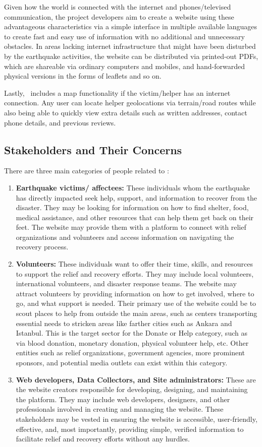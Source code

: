 Given how the world is connected with the internet and phones/televised communication, the project developers aim to create a website using these advantageous characteristics via a simple interface in multiple available languages to create fast and easy use of information with no additional and unnecessary obstacles. In areas lacking internet infrastructure that might have been disturbed by the earthquake activities, the website can be distributed via printed-out PDFs, which are shareable via ordinary computers and mobiles, and hand-forwarded physical versions in the forms of leaflets and so on.

Lastly, \afetbilgi\ includes a map functionality if the victim/helper has an internet connection. Any user can locate helper geolocations via terrain/road routes while also being able to quickly view extra details such as written addresses, contact phone details, and previous reviews.

\subsection{Stakeholders and Their Concerns}

There are three main categories of people related to \afetbilgi:
\begin{enumerate}
  \item \textbf{Earthquake victims/ affectees:} These individuals whom the earthquake has directly impacted seek help, support, and information to recover from the disaster. They may be looking for information on how to find shelter, food, medical assistance, and other resources that can help them get back on their feet. The website may provide them with a platform to connect with relief organizations and volunteers and access information on navigating the recovery process.
  \item \textbf{Volunteers:} These individuals want to offer their time, skills, and resources to support the relief and recovery efforts. They may include local volunteers, international volunteers, and disaster response teams. The website may attract volunteers by providing information on how to get involved, where to go, and what support is needed. Their primary use of the website could be to scout places to help from outside the main areas, such as centers transporting essential needs to stricken areas like farther cities such as Ankara and Istanbul. This is the target sector for the Donate or Help category, such as via blood donation, monetary donation, physical volunteer help, etc. Other entities such as relief organizations, government agencies, more prominent sponsors, and potential media outlets can exist within this category.
  \item \textbf{Web developers, Data Collectors, and Site administrators:} These are the website creators responsible for developing, designing, and maintaining the platform. They may include web developers, designers, and other professionals involved in creating and managing the website. These stakeholders may be vested in ensuring the website is accessible, user-friendly, effective, and, most importantly, providing simple, verified information to facilitate relief and recovery efforts without any hurdles.
\end{enumerate}
